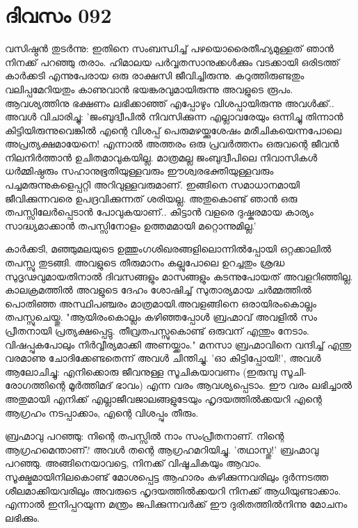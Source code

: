 \newpage
\section{ദിവസം 092}


വസിഷ്ഠന്‍ തുടര്‍ന്നു: ഇതിനെ സംബന്ധിച്ച്‌ പഴയൊരൈതീഹ്യമുള്ളത്‌ ഞാന്‍ നിനക്ക്‌ പറഞ്ഞു തരാം. ഹിമാലയ പര്‍വ്വതസാനുക്കള്‍ക്കും വടക്കായി ഒരിടത്ത്‌ കാര്‍ക്കടി എന്നുപേരായ ഒരു രാക്ഷസി ജീവിച്ചിരുന്നു. കറുത്തിരുണ്ടതും വലിപ്പമേറിയതും കാണുവാന്‍ ഭയങ്കരവുമായിരുന്നു അവളുടെ രൂപം. ആവശ്യത്തിനു ഭക്ഷണം ലഭിക്കാഞ്ഞ്‌ എപ്പോഴും വിശപ്പായിരുന്നു അവള്‍ക്ക്‌..  അവള്‍ വിചാരിച്ചു: 'ജംബുദ്വീപില്‍ നിവസിക്കുന്ന എല്ലാവരേയും ഒന്നിച്ചു തിന്നാന്‍ കിട്ടിയിരുന്നുവെങ്കില്‍ എന്റെ വിശപ്പ്‌ പെരുമഴയ്ക്കുശേഷം മരീചികയെന്നപോലെ അപ്രത്യക്ഷമായേനെ! എന്നാല്‍ അത്തരം ഒരു പ്രവര്‍ത്തനം ഒരുവന്റെ ജീവന്‍ നിലനിര്‍ത്താന്‍ ഉചിതമാവുകയില്ല. മാത്രമല്ല ജംബുദ്വീപിലെ നിവാസികള്‍ ധര്‍മ്മിഷ്ഠരും സഹാനുഭൂതിയുള്ളവരും ഈശ്വരഭക്തിയുള്ളവരും പച്ചമരുന്നുകളെപ്പറ്റി അറിവുള്ളവരുമാണ്‌. ഇങ്ങിനെ സമാധാനമായി ജീവിക്കുന്നവരെ ഉപദ്രവിക്കുന്നത്‌ ശരിയല്ല. അതുകൊണ്ട്‌ ഞാന്‍ ഒരു തപസ്സിലേര്‍പ്പെടാന്‍ പോവുകയാണ്‌..  കിട്ടാന്‍ വളരെ ദുഷ്കരമായ കാര്യം സാദ്ധ്യമാക്കാന്‍ തപസ്സിനോളം ഉത്തമമായി മറ്റൊന്നുമില്ല.'

കാര്‍ക്കടി, മഞ്ഞുമലയുടെ ഉത്തുംഗശിഖരങ്ങളിലൊന്നില്‍പ്പോയി ഒറ്റക്കാലില്‍ തപസ്സു തുടങ്ങി. അവളുടെ തീരുമാനം കല്ലുപോലെ ഉറച്ചതും ശ്രദ്ധ സുദൃഢവുമായതിനാല്‍ ദിവസങ്ങളും മാസങ്ങളും കടന്നുപോയത്‌ അവളറിഞ്ഞില്ല. കാലക്രമത്തില്‍ അവളുടെ ദേഹം ശോഷിച്ച്‌ സുതാര്യമായ ചര്‍മ്മത്തില്‍ പൊതിഞ്ഞ അസ്ഥിപഞ്ചരം മാത്രമായി.അവളങ്ങിനെ ഒരായിരംകൊല്ലം തപസ്സുചെയ്തു. "ആയിരംകൊല്ലം കഴിഞ്ഞപ്പോള്‍ ബ്രഹ്മാവ്‌ അവളില്‍ സം പ്രീതനായി പ്രത്യക്ഷപ്പെട്ടു. തീവ്രതപസ്സുകൊണ്ട്‌ ഒരുവന്‌ എന്തും നേടാം. വിഷപ്പുകപോലും നിര്‍വ്വീര്യമാക്കി അണയ്ക്കാം." മനസാ ബ്രഹ്മാവിനെ വന്ദിച്ച്‌ എന്തു വരമാണു ചോദിക്കേണ്ടതെന്ന് അവള്‍ ചിന്തിച്ചു. 'ഓ കിട്ടിപ്പോയി!', അവള്‍ ആലോചിച്ചു: എനിക്കൊരു ജീവനുള്ള സൂചികയാവണം (ഇരുമ്പു സൂചി- രോഗത്തിന്റെ മൂര്‍ത്തിമദ്‌ ഭാവം) എന്ന വരം ആവശ്യപ്പെടാം. ഈ വരം ലഭിച്ചാല്‍ അതുമായി എനിക്ക്‌ എല്ലാജീവജാലങ്ങളുടേയും ഹൃദയത്തില്‍ക്കയറി എന്റെ ആഗ്രഹം നടപ്പാക്കാം, എന്റെ വിശപ്പും തീരും. 

ബ്രഹ്മാവു പറഞ്ഞു: നിന്റെ തപസ്സില്‍ നാം സംപ്രീതനാണ്‌. നിന്റെ ആഗ്രഹമെന്താണ്‌? അവള്‍ തന്റെ ആഗ്രഹമറിയിച്ചു. 'തഥാസ്തു!' ബ്രഹ്മാവു പറഞ്ഞു. അങ്ങിനെയാവട്ടെ, നിനക്ക്‌ വിഷൂചികയും ആവാം. സൂക്ഷ്മമായിനിലകൊണ്ട്‌ മോശപ്പെട്ട ആഹാരം കഴിക്കുന്നവരിലും ദുര്‍ന്നടത്ത ശീലമാക്കിയവരിലും അവരുടെ ഹൃദയത്തില്‍ക്കയറി നിനക്ക്‌ ആധിയുണ്ടാക്കാം. എന്നാല്‍ ഇനിപ്പറയുന്ന മന്ത്രം ജപിക്കുന്നവര്‍ക്ക്‌ ഈ ദുരിതത്തില്‍നിന്നു മോചനം ലഭിക്കും.

